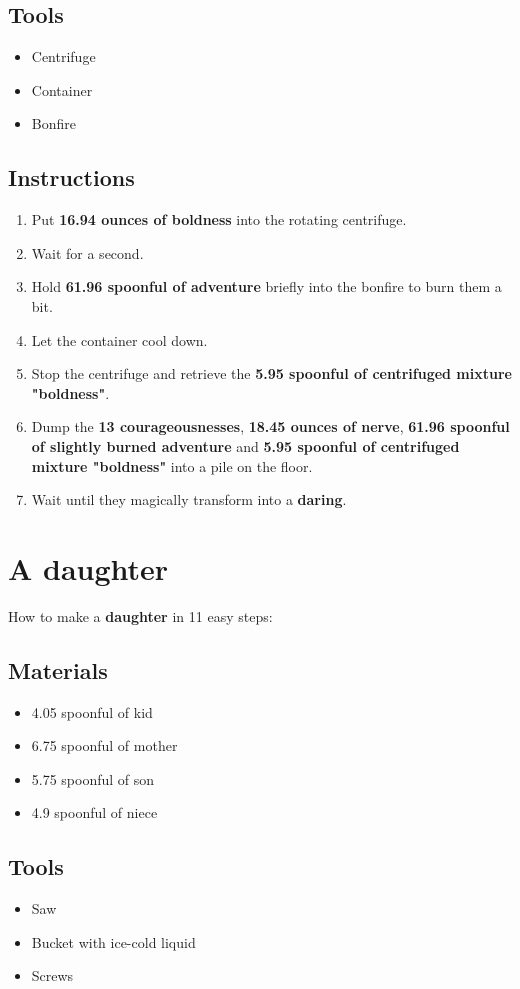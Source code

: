 \documentclass{article}
\begin{document}
\subsection{Tools}\begin{itemize}
\item 
Centrifuge
\item 
Container
\item 
Bonfire
\end{itemize}
\subsection{Instructions}\begin{enumerate}
\item 
Put \textbf{16.94 ounces of boldness} into the rotating centrifuge.
\item 
Wait for a second.
\item 
Hold \textbf{61.96 spoonful of adventure} briefly into the bonfire to burn them a bit.
\item 
Let the container cool down.
\item 
Stop the centrifuge and retrieve the \textbf{5.95 spoonful of centrifuged mixture "boldness"}.
\item 
Dump the \textbf{13 courageousnesses}, \textbf{18.45 ounces of nerve}, \textbf{61.96 spoonful of slightly burned adventure} and \textbf{5.95 spoonful of centrifuged mixture "boldness"} into a pile on the floor.
\item 
Wait until they magically transform into a \textbf{daring}.
\end{enumerate}
\newpage
\section{A daughter}How to make a \textbf{daughter} in 11 easy steps:

\subsection{Materials}\begin{itemize}
\item 
4.05 spoonful of kid
\item 
6.75 spoonful of mother
\item 
5.75 spoonful of son
\item 
4.9 spoonful of niece
\end{itemize}
\subsection{Tools}\begin{itemize}
\item 
Saw
\item 
Bucket with ice-cold liquid
\item 
Screws
\end{itemize}
\end{document}
